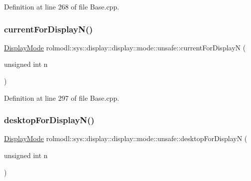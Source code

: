 Definition at line 268 of file Base.\+cpp.

\mbox{\label{namespacerolmodl_1_1sys_1_1display_1_1display_1_1mode_1_1unsafe_a0bd35b1e877e5f2eceb677bc07347829}} 
\subsubsection{\texorpdfstring{currentForDisplayN()}{currentForDisplayN()}}
{\footnotesize\ttfamily \mbox{\hyperlink{structrolmodl_1_1sys_1_1display_1_1display_1_1mode_1_1_display_mode}{Display\+Mode}} rolmodl\+::sys\+::display\+::display\+::mode\+::unsafe\+::current\+For\+DisplayN (\begin{DoxyParamCaption}\item[{unsigned int}]{n }\end{DoxyParamCaption})}



Definition at line 297 of file Base.\+cpp.

\mbox{\label{namespacerolmodl_1_1sys_1_1display_1_1display_1_1mode_1_1unsafe_ac28160e54f640dba87cb719ea71d759a}} 
\subsubsection{\texorpdfstring{desktopForDisplayN()}{desktopForDisplayN()}}
{\footnotesize\ttfamily \mbox{\hyperlink{structrolmodl_1_1sys_1_1display_1_1display_1_1mode_1_1_display_mode}{Display\+Mode}} rolmodl\+::sys\+::display\+::display\+::mode\+::unsafe\+::desktop\+For\+DisplayN (\begin{DoxyParamCaption}\item[{unsigned int}]{n }\end{DoxyParamCaption})}



